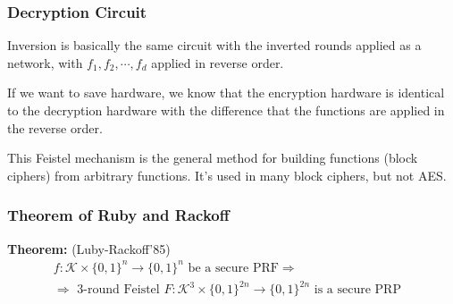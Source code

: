 \documentclass[12pt]{book}
\newcommand{\Thm}{\textbf{Theorem:} }
\begin{document}
\subsubsection{Decryption Circuit}
Inversion is basically the same circuit with the inverted rounds applied as a network, with $f_{1},f_{2},\cdots,f_{d}$ applied in reverse order.

If we want to save hardware, we know that the encryption hardware is identical to the decryption hardware with the difference that the functions are applied in the reverse order.

This Feistel mechanism is the general method for building functions (block ciphers) from arbitrary functions. It's used in many block ciphers, but not AES.

\subsubsection{Theorem of Ruby and Rackoff}
\Thm (Luby-Rackoff'85)
$$\begin{array}{cl}
	f:\mathcal{K}\times\{0,1\}^{n}\rightarrow\{0,1\}^{n}\text{ be a secure PRF}\Rightarrow&\\[0.2cm]
	\Rightarrow\text{ 3-round Feistel }F:\mathcal{K}^{3}\times\{0,1\}^{2n}\rightarrow\{0,1\}^{2n}\text{ is a secure PRP}&
\end{array}$$
\end{document}
